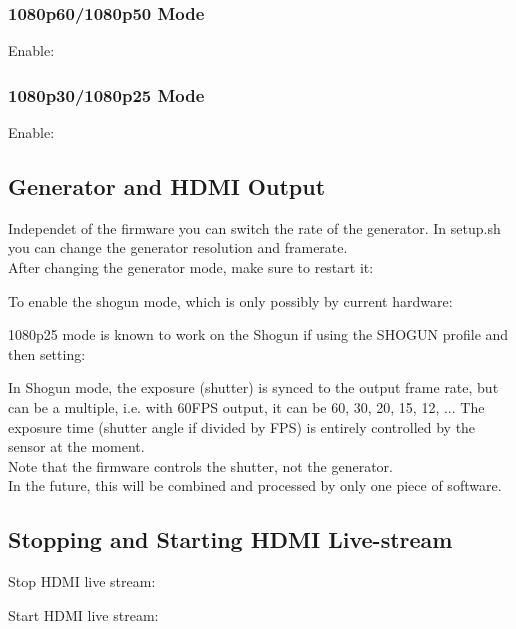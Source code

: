 \subsubsection{1080p60/1080p50 Mode}

Enable:

    
    
    


\subsubsection{1080p30/1080p25 Mode}

Enable:





\subsection{Generator and HDMI Output}


Independet of the firmware you can switch the rate of the generator. In setup.sh you can change the generator resolution and framerate.\\

After changing the generator mode, make sure to restart it: 


    
    
To enable the shogun mode, which is only possibly by current hardware:

	
1080p25 mode is known to work on the Shogun if using the SHOGUN profile and then setting:	
    
	
In Shogun mode, the exposure (shutter) is synced to the output frame rate, but can be a multiple, i.e. with 60FPS output, it can be 60, 30, 20, 15, 12, ... The exposure time (shutter angle if divided by FPS) is entirely controlled by the sensor at the moment.\\

Note that the firmware controls the shutter, not the generator.\\

In the future, this will be combined and processed by only one piece of software.\\	
	




\subsection{Stopping and Starting HDMI Live-stream}

Stop HDMI live stream: 


Start HDMI live stream: 

